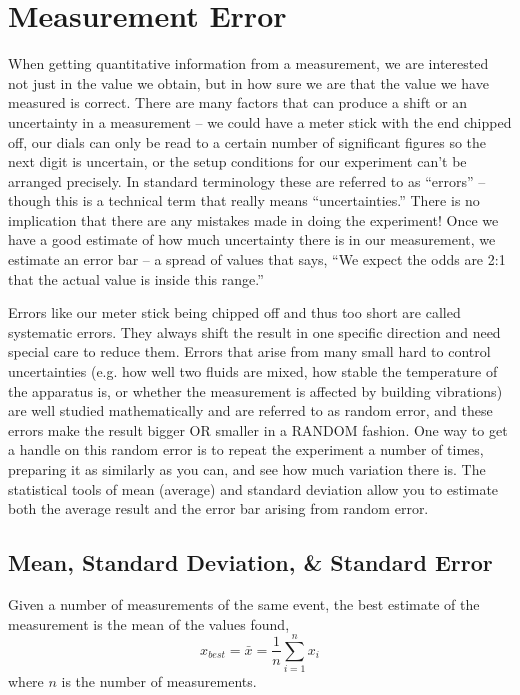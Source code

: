 \chapter{Measurement Error}
\thispagestyle{fancy}
\label{chap:error}
%
When getting quantitative information from a measurement, we are interested not just in the value
we obtain, but in how sure we are that the value we have measured is correct.
There are many factors that can produce a shift or an uncertainty in a measurement – we could have a meter stick with the end chipped off, our dials can only be read to a certain number of significant figures so the next digit is uncertain, or the setup conditions for our experiment can't be arranged precisely. 
In standard terminology these are referred to as ``errors'' – though this is a technical term that really means ``uncertainties.'' 
There is no implication that there are any mistakes made in doing the experiment!
Once we have a good estimate of how much uncertainty there is in our measurement, we estimate an error bar – a spread of values that says, ``We expect the odds are 2:1 that the actual value is inside this range.''
\par
Errors like our meter stick being chipped off and thus too short are called systematic errors. 
They always shift the result in one specific direction and need special care to reduce them.
Errors that arise from many small hard to control uncertainties (e.g. how well two fluids are mixed, how stable the temperature of the apparatus is, or whether the measurement is affected by building vibrations) are well studied mathematically and are referred to as random error, and these errors make the result bigger OR smaller in a RANDOM fashion. 
One way to get a handle on this random error is to repeat the experiment a number of times, preparing it as similarly as you can, and see how much variation there is. 
The statistical tools of mean (average) and standard deviation allow you to estimate both the average result and the error bar arising from random error.

\section*{Mean, Standard Deviation, \& Standard Error}
Given a number of measurements of the same event, the best estimate of the measurement is the mean of the values found,
\[ x_{best} = \bar{x} = \frac{1}{n} \sum_{i=1}^{n} x_{i} \]
where $n$ is the number of measurements.

